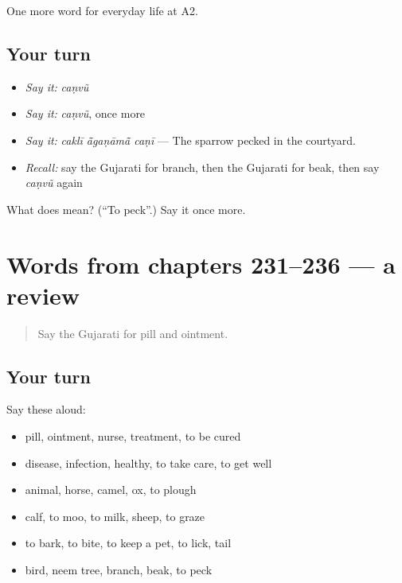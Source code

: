 \begin{grammarlens}[title={What you've built}]
One more word for everyday life at A2.
\end{grammarlens}

\subsection*{Your turn}
\begin{itemize}
\raggedright
  \item \emph{Say it:} \emph{caṇvũ}
  \item \emph{Say it:} \emph{caṇvũ}, once more
  \item \emph{Say it:} \emph{caklī ā̃gaṇāmā̃ caṇī} — The sparrow pecked in the courtyard.
  \item \emph{Recall:} say the Gujarati for branch, then the Gujarati for beak, then say \emph{caṇvũ} again
\end{itemize}

\begin{tcolorbox}[breakable,colback=teal!4,colframe=teal!35!black,title={Before you move on}]
What does  mean? (\textquotedblleft{}To peck\textquotedblright{}.) Say it once more.
\end{tcolorbox}
\section[(dialogue)]{Words from chapters 231–236 — a review}

\label{lesson:GU-R236-review-231-236}



\begin{quote}
Say the Gujarati for pill and ointment.
\end{quote}

\subsection*{Your turn}
Say these aloud:

\begin{itemize}
\raggedright
  \item pill, ointment, nurse, treatment, to be cured
  \item disease, infection, healthy, to take care, to get well
  \item animal, horse, camel, ox, to plough
  \item calf, to moo, to milk, sheep, to graze
  \item to bark, to bite, to keep a pet, to lick, tail
  \item bird, neem tree, branch, beak, to peck
\end{itemize}

